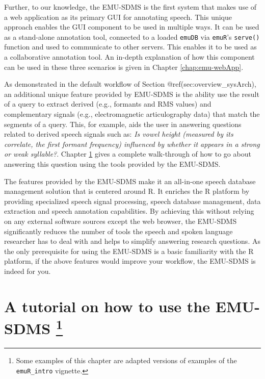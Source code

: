 \documentclass[]{book}
\let\rmarkdownfootnote\footnote%
\def\footnote{\protect\rmarkdownfootnote}
\theoremstyle{definition}
\theoremstyle{definition}
\theoremstyle{definition}
\theoremstyle{remark}
\begin{document}
Further, to our knowledge, the EMU-SDMS is the first system that makes
use of a web application as its primary GUI for annotating speech. This
unique approach enables the GUI component to be used in multiple ways.
It can be used as a stand-alone annotation tool, connected to a loaded
\texttt{emuDB} via \texttt{emuR}'s \texttt{serve()} function and used to
communicate to other servers. This enables it to be used as a
collaborative annotation tool. An in-depth explanation of how this
component can be used in these three scenarios is given in Chapter
\ref{chap:emu-webApp}.

As demonstrated in the default workflow of Section
@ref(sec:overview\_sysArch), an additional unique feature provided by
EMU-SDMS is the ability use the result of a query to extract derived
(e.g., formants and RMS values) and complementary signals (e.g.,
electromagnetic articulography data) that match the segments of a query.
This, for example, aids the user in answering questions related to
derived speech signals such as: \emph{Is vowel height (measured by its
correlate, the first formant frequency) influenced by whether it appears
in a strong or weak syllable?}. Chapter \ref{chap:tutorial} gives a
complete walk-through of how to go about answering this question using
the tools provided by the EMU-SDMS.

The features provided by the EMU-SDMS make it an all-in-one speech
database management solution that is centered around R. It enriches the
R platform by providing specialized speech signal processing, speech
database management, data extraction and speech annotation capabilities.
By achieving this without relying on any external software sources
except the web browser, the EMU-SDMS significantly reduces the number of
tools the speech and spoken language researcher has to deal with and
helps to simplify answering research questions. As the only prerequisite
for using the EMU-SDMS is a basic familiarity with the R platform, if
the above features would improve your workflow, the EMU-SDMS is indeed
for you.

\chapter[A tutorial on how to use the EMU-SDMS ]{\texorpdfstring{A
tutorial on how to use the EMU-SDMS \footnote{Some examples of this
  chapter are adapted versions of examples of the \texttt{emuR\_intro}
  vignette.}}{A tutorial on how to use the EMU-SDMS }}\label{chap:tutorial}
\end{document}
